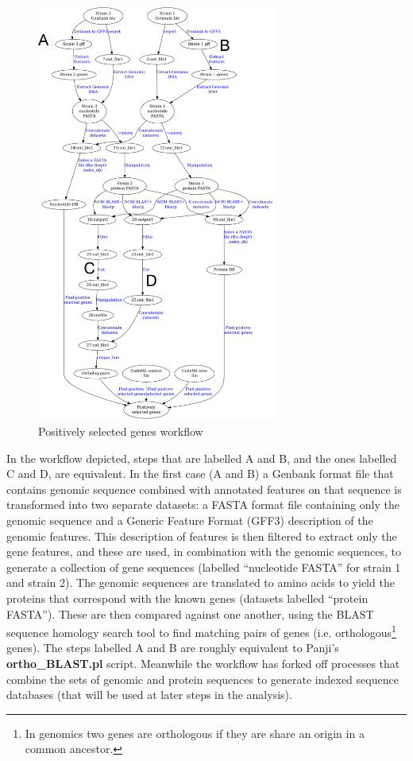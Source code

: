 \documentclass[a4paper,10pt]{scrreprt} \usepackage[utf8]{inputenc}
\begin{document}
\begin{figure}[!htb]
\centering
\includegraphics[width=0.7\textwidth]{images/positive_selection_workflow_graph.png}
\caption{Positively selected genes workflow}
\label{fig:positive_selection_workflow_graph}
\end{figure}

In the workflow depicted, steps that are labelled A and B, and the ones labelled C and D, are equivalent. In the first case (A and B) a Genbank format file that contains genomic sequence combined with annotated features on that sequence is transformed into two separate datasets: a FASTA format file containing only the genomic sequence and a Generic Feature Format (GFF3) description of the genomic features. This description of features is then filtered to extract only the gene features, and these are used, in combination with the genomic sequences, to generate a collection of gene sequences (labelled ``nucleotide FASTA'' for strain 1 and strain 2). The genomic sequences are translated to amino acids to yield the proteins that correspond with the known genes (datasets labelled ``protein FASTA''). These are then compared against one another, using the BLAST sequence homology search tool to find matching pairs of genes (i.e. orthologous\footnote{In genomics two genes are orthologous if they are share an origin 
in a common ancestor.} genes). The steps labelled A and B are roughly equivalent to Panji's \textbf{ortho\_BLAST.pl} script. Meanwhile the workflow has forked off processes that combine the sets of genomic and protein sequences to generate indexed sequence databases (that will be used at later steps in the analysis).
\end{document}
